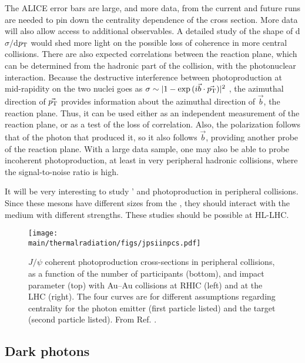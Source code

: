 \documentclass[../report.tex]{subfiles}
\providecommand{\main}{..}
\begin{document}
The ALICE error bars are large, and more data, from the current and future runs are needed to pin down the centrality dependence of the cross section.  More data will also allow access to additional observables. A detailed study of the shape of d$\sigma/$d$p\sb{\scriptstyle\mathrm{T}}$ would shed more light on the possible loss of coherence in more central collisions. There are also expected correlations between the reaction plane, which can be determined from the hadronic part of the collision, with the photonuclear interaction.  Because the destructive interference between photoproduction at mid-rapidity on the two nuclei goes as $\sigma \sim |1-\exp{(i{\vec{b}\cdot\vec{\pT})}}|^2$ \cite{Klein:1999gv}, the azimuthal direction of $\vec{p\sb{\scriptstyle\mathrm{T}}}$ provides information about the azimuthal direction of $\vec{b}$, \ie the reaction plane.  Thus, it can be used either as an independent measurement of the reaction plane, or as a test of the loss of correlation.  Also, the \PJGy polarization follows that of the photon that produced it, so it also follows $\vec{b}$, providing another probe of the reaction plane.  With a large data sample, one may also be able to probe incoherent \PJGy photoproduction, at least in very peripheral hadronic collisions, where the signal-to-noise ratio is high.  

It will be very interesting to study \PGy' and \PGU photoproduction in peripheral collisions.  Since these mesons have different sizes from the \PJGy, they should interact with the medium with different strengths.  These studies should be possible at HL-LHC.  

\begin{figure}[htb]
\centering
\texttt{[image: \\main/thermalradiation/figs/jpsiinpcs.pdf]}
\caption{$J/\psi$ coherent photoproduction cross-sections in peripheral collisions, as a function of the number of participants (bottom), and impact parameter (top) with Au--Au collisions at RHIC (left) and \PbPb at the LHC (right).  The four curves are for different assumptions regarding centrality for the photon emitter (first particle listed) and the target (second particle listed).  From Ref. \cite{Adam:2015gba,Zha:2017jch}.}
\label{fig:jpsiinpcs} 
\end{figure}


\subsection{Dark photons}
\label{sec:dileptons:darkphotons}
\end{document}
